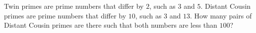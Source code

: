 Twin primes are prime numbers that differ by $2$, such as $3$ and $5$. Distant Cousin primes are prime numbers that differ by $10$, such as $3$ and $13$. How many pairs of Distant Cousin primes are there such that both numbers are less than $100$?
